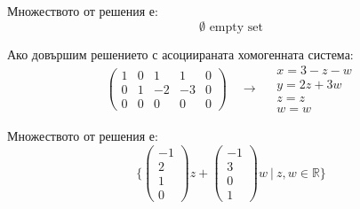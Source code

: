 \documentclass{subfiles}
\begin{document}
\noindent Множеството от решения е:
\begin{equation*}
    \emptyset \text{ empty set}
\end{equation*}

\noindent Ако довършим решението с асоциираната хомогенната система:
\begin{equation*}
    \left(
        \begin{array}{ cccc|c }
            1 & 0 & 1  &  1 & 0 \\
            0 & 1 & -2 & -3 & 0 \\
            0 & 0 &  0 &  0 & 0
        \end{array}
    \right)
    \quad
    \longrightarrow
    \quad
    \begin{array}{c}
        x = 3 - z - w \\
        y = 2z + 3w \\
        z = z \\
        w = w
    \end{array}
\end{equation*}

\noindent Множеството от решения е:
\begin{equation*}
    \{
        \left(\begin{array}{ c } -1 \\ 2 \\ 1 \\ 0 \end{array}\right) z +
        \left(\begin{array}{ c } -1 \\ 3 \\ 0 \\ 1 \end{array}\right) w
        \ |\ z, w \in \mathbb{R}
    \}
\end{equation*}
\end{document}
